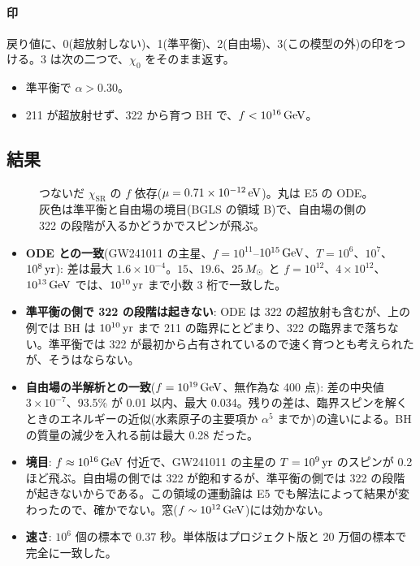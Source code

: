 \paragraph{印}
戻り値に、0(超放射しない)、1(準平衡)、2(自由場)、3(この模型の外)の印をつける。3 は次の二つで、$\chi_0$ をそのまま返す。
\begin{itemize}
\item 準平衡で $\alpha>0.30$。
\item 211 が超放射せず、322 から育つ BH で、$f<10^{16}\,\mathrm{GeV}$。
\end{itemize}

\subsection{結果}

\begin{figure}[H]
\centering

\caption{つないだ $\chi_\mathrm{SR}$ の $f$ 依存($\mu=0.71\times10^{-12}\,\mathrm{eV}$)。丸は E5 の ODE。灰色は準平衡と自由場の境目(BGLS の領域 B)で、自由場の側の 322 の段階が入るかどうかでスピンが飛ぶ。}
\label{fig:e11}
\end{figure}

\begin{result}
\begin{itemize}
\item \textbf{ODE との一致}(GW241011 の主星、$f=10^{11}$--$10^{15}\,\mathrm{GeV}$、$T=10^6$、$10^7$、$10^8\,\mathrm{yr}$): 差は最大 $1.6\times10^{-4}$。$15$、$19.6$、$25\,M_\odot$ と $f=10^{12}$、$4\times10^{12}$、$10^{13}\,\mathrm{GeV}$ では、$10^{10}\,\mathrm{yr}$ まで小数 3 桁で一致した。
\item \textbf{準平衡の側で 322 の段階は起きない}: ODE は 322 の超放射も含むが、上の例では BH は $10^{10}\,\mathrm{yr}$ まで 211 の臨界にとどまり、322 の臨界まで落ちない。準平衡では 322 が最初から占有されているので速く育つとも考えられたが、そうはならない。
\item \textbf{自由場の半解析との一致}($f=10^{19}\,\mathrm{GeV}$、無作為な 400 点): 差の中央値 $3\times10^{-7}$、93.5\% が 0.01 以内、最大 0.034。残りの差は、臨界スピンを解くときのエネルギーの近似(水素原子の主要項か $\alpha^5$ までか)の違いによる。BH の質量の減少を入れる前は最大 0.28 だった。
\item \textbf{境目}: $f\approx10^{16}\,\mathrm{GeV}$ 付近で、GW241011 の主星の $T=10^9\,\mathrm{yr}$ のスピンが 0.2 ほど飛ぶ。自由場の側では 322 が飽和するが、準平衡の側では 322 の段階が起きないからである。この領域の運動論は E5 でも解法によって結果が変わったので、確かでない。窓($f\sim10^{12}\,\mathrm{GeV}$)には効かない。
\item \textbf{速さ}: $10^6$ 個の標本で 0.37 秒。単体版はプロジェクト版と 20 万個の標本で完全に一致した。
\end{itemize}
\end{result}

